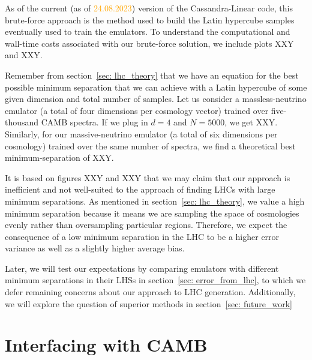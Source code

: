 As of the current (as of \textcolor{orange}{24.08.2023}) version of the
Cassandra-Linear code, this brute-force approach is the method used to build
the Latin hypercube samples eventually used to train the emulators. To 
understand the computational and wall-time costs associated with our
brute-force solution, we include plots XXY and XXY.

Remember from section~\ref{sec: lhc_theory} that we have an equation for the
best possible minimum separation that we can achieve with a Latin hypercube
of some given dimension and total number of samples. Let us consider a massless-neutrino emulator (a total of four dimensions per cosmology vector)
trained over five-thousand CAMB spectra. If we plug in $d = 4$ and $N=5000$,
we get XXY. Similarly, for our massive-neutrino emulator (a total of six 
dimensions per cosmology) trained over the same number of spectra, we find a 
theoretical best minimum-separation of XXY. 

It is based on figures XXY and XXY that we may claim that our approach is
inefficient and not well-suited to the approach of finding LHCs with large
minimum separations. As mentioned in section~\ref{sec: lhc_theory},
we value a high minimum separation because it means we are sampling the
space of cosmologies evenly rather than oversampling particular regions.
Therefore, we expect the consequence of a low minimum separation in the LHC to
be a higher error variance as well as a slightly higher average bias.


Later, we will test our expectations by comparing emulators with different
minimum separations in their LHSs in section~\ref{sec: error_from_lhc}, to
which we defer remaining concerns about our approach to LHC generation.
Additionally, we will explore the question of superior methods in
section~\ref{sec: future_work}


\section{Interfacing with CAMB}



